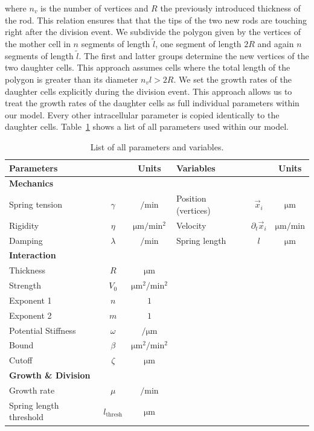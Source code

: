 where $n_v$ is the number of vertices and $R$ the previously introduced thickness of the rod.
This relation ensures that that the tips of the two new rods are touching right after
the division
event.
We subdivide the polygon given by the vertices of the mother cell in $n$ segments of length
$\tilde{l}$, one segment of length $2R$ and again $n$ segments of length $\tilde{l}$.
The first and latter groups determine the new vertices of the two daughter cells.
This approach assumes cells where the total length of the polygon is greater than its diameter
$n_vl>2R$.
We set the growth rates of the daughter cells explicitly during the division event.
This approach allows us to treat the growth rates of the daughter cells as full individual
parameters within our model.
Every other intracellular parameter is copied identically to the daughter cells.
Table~\ref{table:list-of-parameters} shows a list of all parameters used within our model.

\begin{table}[H]
    \centering
    \def\arraystretch{1.3}
    \begin{tabular}{l c c l c c}
        \textbf{Parameters} && \textbf{Units} & \textbf{Variables} && \textbf{Units}\\
        \toprule
        \multicolumn{4}{l}{\textbf{Mechanics}}\\
        \midrule
        Spring tension & $\gamma$ & $\unit{\per\minute}$ & Position (vertices) &
        $\vec{x}_i$ & $\unit{\micro\metre}$\\
        Rigidity & $\eta$ & $\unit{\micro\metre\per\minute^2}$ & Velocity &
        $\partial_t\vec{x}_i$ & $\unit{\micro\metre\per\minute}$\\
        Damping & $\lambda$ & $\unit{\per\minute}$ & Spring length & $l$ &
        $\unit{\micro\metre}$\\
        \multicolumn{4}{l}{\textbf{Interaction}}\\
        \midrule
        Thickness & $R$ & $\unit{\micro\metre}$\\
        Strength & $V_0$ & $\unit{\micro\metre^2\per\minute^2}$\\
        Exponent 1 & $n$ & $1$\\
        Exponent 2 & $m$ & $1$\\
        Potential Stiffness & $\omega$ & $\unit{\per\micro\metre}$\\
        Bound & $\beta$ & $\unit{\micro\metre^2\per\minute^2}$\\
        Cutoff & $\zeta$ & $\unit{\micro\metre}$\\
        \multicolumn{4}{l}{\textbf{Growth \& Division}}\\
        \midrule
        Growth rate & $\mu$ &$\unit{\per\minute}$\\
        Spring length threshold & $l_\text{thresh}$ &$\unit{\micro\metre}$\\
        \bottomrule
    \end{tabular}
    \caption{
        List of all parameters and variables.
    }
    \label{table:list-of-parameters}
\end{table}

